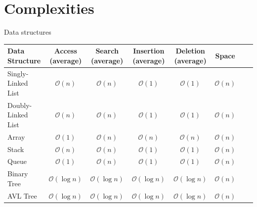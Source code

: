 \documentclass [12pt, executivepaper]{article}
\begin{document}
\section*{Complexities}

Data structures

\vspace{3mm}

\begin{adjustbox}{max height=6in, max width=6in}

    \begin{tabular}{l*{6}{c}r}
    
    Data Structure & Access (average) & Search (average) & Insertion (average) & Deletion (average) & Space \\
    
    \hline
    
    Singly-Linked List & $\mathcal{O}(n)$ & $\mathcal{O}(n)$ & $\mathcal{O}(1)$ & $\mathcal{O}(1)$ & $\mathcal{O}(n)$  \\
    
    Doubly-Linked List & $\mathcal{O}(n)$ & $\mathcal{O}(n)$ & $\mathcal{O}(1)$ & $\mathcal{O}(1)$ & $\mathcal{O}(n)$  \\
    
    Array & $\mathcal{O}(1)$ & $\mathcal{O}(n)$ & $\mathcal{O}(n)$ & $\mathcal{O}(n)$ & $\mathcal{O}(n)$  \\
    
    Stack & $\mathcal{O}(n)$ & $\mathcal{O}(n)$ & $\mathcal{O}(1)$ & $\mathcal{O}(1)$ & $\mathcal{O}(n)$  \\
    
    Queue & $\mathcal{O}(1)$ & $\mathcal{O}(n)$ & $\mathcal{O}(1)$ & $\mathcal{O}(1)$ & $\mathcal{O}(n)$  \\
    
    Binary Tree & $\mathcal{O}(\log{} n)$ & $\mathcal{O}(\log{} n)$ & $\mathcal{O}(\log{} n)$ & $\mathcal{O}(\log{} n)$ & $\mathcal{O}(n)$  \\
    
    AVL Tree & $\mathcal{O}(\log{} n)$ & $\mathcal{O}(\log{} n)$ & $\mathcal{O}(\log{} n)$ & $\mathcal{O}(\log{} n)$ & $\mathcal{O}(n)$
    
    \end{tabular}
    
\end{adjustbox}
\end{document}

